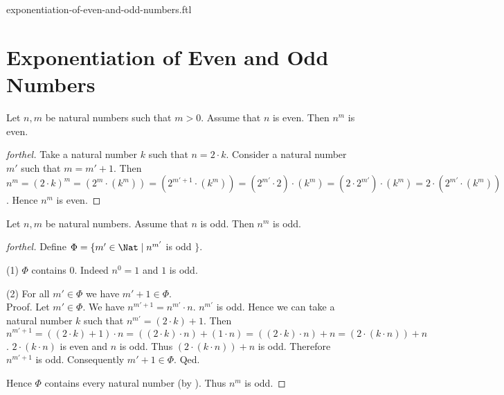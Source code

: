 \documentclass{naproche-library}
\begin{document}
\begin{smodule}{exponentiation-of-even-and-odd-numbers.ftl}

  \section*{Exponentiation of Even and Odd Numbers}

  \begin{proposition}[forthel,id=ARITHMETIC_15_1023659658745214,printid]
    Let $n, m$ be natural numbers such that $m > 0$.
    Assume that $n$ is even.
    Then $n^{m}$ is even.
  \end{proposition}
  \begin{proof}[forthel]
    Take a natural number $k$ such that $n = 2 \cdot k$.
    Consider a natural number $m'$ such that $m = m' + 1$.
    Then $n^{m}
      = (2 \cdot k)^{m}
      = (2^{m} \cdot (k^{m}))
      = (2^{m' + 1} \cdot (k^{m}))
      = (2^{m'} \cdot 2) \cdot (k^{m})
      = (2 \cdot 2^{m'}) \cdot (k^{m})
      = 2 \cdot (2^{m'} \cdot (k^{m}))$.
    Hence $n^{m}$ is even.
  \end{proof}

  \begin{proposition}[forthel,id=ARITHMETIC_15_0021200236556985,printid]
    Let $n, m$ be natural numbers.
    Assume that $n$ is odd.
    Then $n^{m}$ is odd.
  \end{proposition}
  \begin{proof}[forthel]
    Define $\Phi = \{ m' \in \Nat \mid n^{m'}$ is odd $\}$.

    (1) $\Phi$ contains $0$.
    Indeed $n^{0} = 1$ and $1$ is odd.

    (2) For all $m' \in \Phi$ we have $m' + 1 \in \Phi$. \\
    Proof.
      Let $m' \in \Phi$.
      We have $n^{m' + 1} = n^{m'} \cdot n$.
      $n^{m'}$ is odd.
      Hence we can take a natural number $k$ such that $n^{m'} = (2 \cdot k) + 1$.
      Then $n^{m' + 1}
        = ((2 \cdot k) + 1) \cdot n
        = ((2 \cdot k) \cdot n) + (1 \cdot n)
        = ((2 \cdot k) \cdot n) + n
        = (2 \cdot (k \cdot n)) + n$.
      $2 \cdot (k \cdot n)$ is even and $n$ is odd.
      Thus $(2 \cdot (k \cdot n)) + n$ is odd.
      Therefore $n^{m' + 1}$ is odd.
      Consequently $m' + 1 \in \Phi$.
    Qed.

    Hence $\Phi$ contains every natural number (by ).
    Thus $n^{m}$ is odd.
  \end{proof}
\end{smodule}
\end{document}
